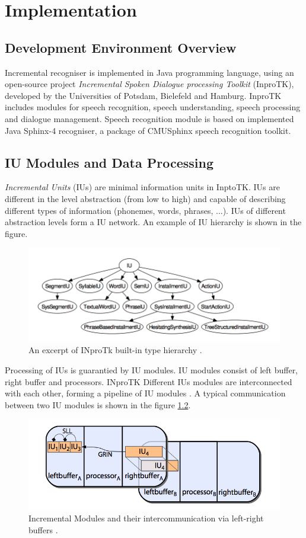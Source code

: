 \chapter{Implementation}
\label{chap:implem}
\section {Development Environment Overview}
Incremental recogniser is implemented in Java programming language, using
an open-source project \textit {Incremental Spoken Dialogue processing
Toolkit} (InproTK), developed by the Universities of Potsdam, Bielefeld and
Hamburg. InproTK includes modules for speech recognition, speech understanding,
speech processing and dialogue management. Speech recognition module is based on
implemented Java Sphinx-4 recogniser, a package of CMUSphinx speech recognition toolkit. 
\section {IU Modules and Data Processing}
\textit {Incremental Units} (IUs) are minimal information units in InptoTK.
IUs are different in the level abstraction (from low to high) and capable of
describing different types of information (phonemes, words, phrases, ...). IUs
of different abstraction levels form a IU network. An example of IU hierarchy is
shown in the figure.
\begin{figure}[htbp]
  \centering
    \includegraphics[width=1.0\textwidth]{images/IUs.png}
 \caption{ An excerpt of INproTk built-in type hierarchy \parencite
 {baumann2013:phd}.}
  \label{fig:IUs}
\end {figure}
Processing of IUs is guarantied by IU modules. IU
modules consist of left buffer, right buffer and processors.  INproTK Different IUs
modules are interconnected with each other, forming a pipeline of IU modules \parencite {baumann2013:phd}. A typical
communication between two IU modules is shown in the figure \ref{fig:IUs}.
\begin{figure}[htbp]
  \centering
    \includegraphics[width=1.0\textwidth]{images/iuandbuffer.png}
 \caption{ Incremental Modules and their intercommunication via left-right
 buffers \parencite {baumann2013:phd}.}
  \label{fig:IUs}
\end {figure}
